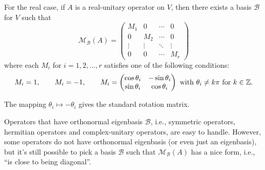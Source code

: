     \begin{corollaryenv}
        For the real case, if $A$ is a real-unitary operator on $V$, then there exists a basis $\mathcal{B}$ for $V$ such that
        $$\mathcal M_{\mathcal{B}}(A) = \begin{pmatrix}
            M_1 & 0 & \cdots & 0 \\
            0 & M_2 & \cdots & 0 \\
            \vdots & \vdots & \ddots & \vdots \\
            0 & 0 & \cdots & M_r
        \end{pmatrix}$$
        where each $M_i$ for $i=1,2,\ldots,r$ satisfies one of the following conditions:
        $$ M_i = 1,\qquad M_i = -1, \qquad M_i = \begin{pmatrix}
            \cos \theta_i & -\sin \theta_i \\
            \sin \theta_i & \cos \theta_i
        \end{pmatrix} \text{ with } \theta_i \neq k\pi \text{ for } k\in \mathbb{Z}. $$
    \end{corollaryenv}
    \begin{remarkenv}
        The mapping $\theta_i \mapsto -\theta_i$ gives the standard rotation matrix.
    \end{remarkenv}
    \begin{remarkenv}
        Operators that have orthonormal eigenbasis $\mathcal B$, i.e., symmetric operators, hermitian operators and complex-unitary operators, are easy to handle. However, some operators do not have orthonormal eigenbasis (or even just an eigenbasis), but it's still possible to pick a basis $\mathcal B$ such that $\mathcal M_{\mathcal B}(A)$ has a nice form, i.e., ``is close to being diagonal''.
    \end{remarkenv}

    \newpage